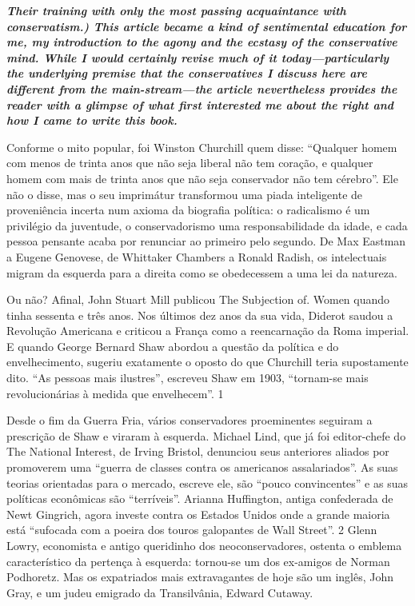  
\par
 

 \textbf{\textit{Their training with only the most passing acquaintance with conservatism.) This article became a kind of sentimental education for me, my introduction to the agony and the ecstasy of the conservative mind. While I would certainly revise much of it today—particularly the underlying premise that the conservatives I discuss here are different from the main-stream—the article nevertheless provides the reader with a glimpse of what first interested me about the right and how I came to write this book.} }  
 
 
\par
 
Conforme o mito popular, foi Winston Churchill quem disse: “Qualquer homem com menos de trinta anos que não seja liberal não tem coração, e qualquer homem com mais de trinta anos que não seja conservador não tem cérebro”. Ele não o disse, mas o seu imprimátur transformou uma piada inteligente de proveniência incerta num axioma da biografia política: o radicalismo é um privilégio da juventude, o conservadorismo uma responsabilidade da idade, e cada pessoa pensante acaba por renunciar ao primeiro pelo segundo. De Max Eastman a Eugene Genovese, de Whittaker Chambers a Ronald Radish, os intelectuais migram da esquerda para a direita como se obedecessem a uma lei da natureza.
 
\par
 
Ou não? Afinal, John Stuart Mill publicou The Subjection of. Women quando tinha sessenta e três anos. Nos últimos dez anos da sua vida, Diderot saudou a Revolução Americana e criticou a França como a reencarnação da Roma imperial. E quando George Bernard Shaw abordou a questão da política e do envelhecimento, sugeriu exatamente o oposto do que Churchill teria supostamente dito. “As pessoas mais ilustres”, escreveu Shaw em 1903, “tornam-se mais revolucionárias à medida que envelhecem”.
 {\color{blue} 1}  

 
\par
 
Desde o fim da Guerra Fria, vários conservadores proeminentes seguiram a prescrição de Shaw e viraram à esquerda. Michael Lind, que já foi editor-chefe do The National Interest, de Irving Bristol, denunciou seus anteriores aliados por promoverem uma “guerra de classes contra os americanos assalariados”. As suas teorias orientadas para o mercado, escreve ele, são “pouco convincentes” e as suas políticas econômicas são “terríveis”. Arianna Huffington, antiga confederada de Newt Gingrich, agora investe contra os Estados Unidos onde a grande maioria está “sufocada com a poeira dos touros galopantes de Wall Street”.
 {\color{blue} 2}  
Glenn Lowry, economista e antigo queridinho dos neoconservadores, ostenta o emblema característico da pertença à esquerda: tornou-se um dos ex-amigos de Norman Podhoretz. Mas os expatriados mais extravagantes de hoje são um inglês, John Gray, e um judeu emigrado da Transilvânia, Edward Cutaway.
 
